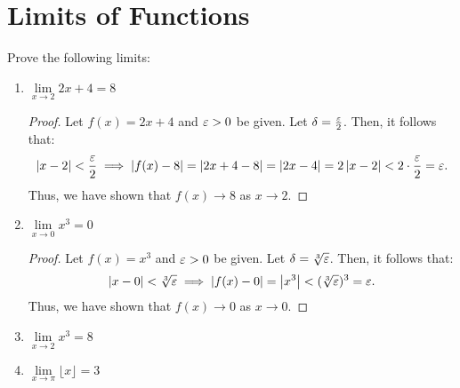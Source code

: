 \section{Limits of Functions}

\begin{problem}
  Prove the following limits:

  \begin{enumerate}[label=(\alph*)]
    \item $\lim\limits_{x \to 2} 2x + 4 = 8$ 
      
      \begin{proof}
        Let $f(x) = 2x + 4$ and $\varepsilon > 0$ be given. Let $\delta = \frac{\varepsilon}{2}$. Then, it follows that: 
        \[
          \left\lvert x - 2 \right\rvert < \frac{\varepsilon}{2} \implies \left\lvert f(x) - 8 \right\rvert = \left\lvert 2x + 4 - 8 \right\rvert = \left\lvert 2x - 4 \right\rvert = 2\left\lvert x - 2 \right\rvert < 2\cdot\frac{\varepsilon}{2} = \varepsilon.
        \]
        Thus, we have shown that $f(x) \to 8$ as $x \to 2$. 
      \end{proof}

    \item $\lim\limits_{x \to 0} x^{3} = 0$ 
      \begin{proof}
        Let $f(x) = x^{3}$ and $\varepsilon > 0$ be given. Let $\delta = \sqrt[3]{\varepsilon}$. Then, it follows that: 
        \[
          \left\lvert x - 0 \right\rvert < \sqrt[3]{\varepsilon} \implies \left\lvert f(x) - 0 \right\rvert = \left\lvert x^{3} \right\rvert < (\sqrt[3]{\varepsilon})^{3} = \varepsilon.
        \]
        Thus, we have shown that $f(x) \to 0$ as $x \to 0$. 
      \end{proof} 

    \item $\lim\limits_{x \to 2} x^{3} = 8$ 

    \item $\lim\limits_{x \to \pi} \lfloor x \rfloor = 3$ 

  \end{enumerate}
\end{problem}
